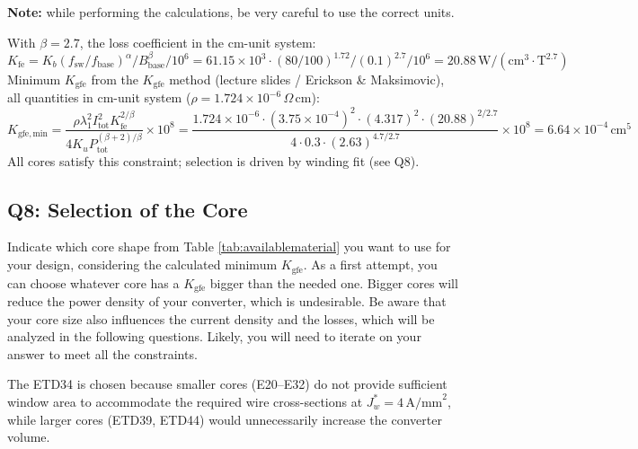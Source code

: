 \documentclass{PELsmallreport}
\begin{document}
\textbf{{Note:}} while performing the calculations, be very careful to use the correct units. \\ 

\begin{framed}
With $\beta=2.7$, the loss coefficient in the cm-unit system:
\begin{equation}
    K_\mathrm{fe} = K_b(f_\mathrm{sw}/f_\mathrm{base})^\alpha/B_\mathrm{base}^\beta/10^6
    = 61.15\!\times\!10^3\cdot(80/100)^{1.72}/(0.1)^{2.7}/10^6 = 20.88\,\mathrm{W/(cm^3\cdot T^{2.7})}
\end{equation}
Minimum $K_\mathrm{gfe}$ from the $K_\mathrm{gfe}$ method (lecture slides / Erickson \& Maksimovic),
all quantities in cm-unit system ($\rho=1.724\!\times\!10^{-6}\,\Omega\,\mathrm{cm}$):
\begin{equation}
    K_\mathrm{gfe,min} = \frac{\rho\lambda_1^2 I_\mathrm{tot}^2 K_\mathrm{fe}^{2/\beta}}{4K_u P_\mathrm{tot}^{(\beta+2)/\beta}}\times10^8
    = \frac{1.724\!\times\!10^{-6}\cdot(3.75\!\times\!10^{-4})^2\cdot(4.317)^2\cdot(20.88)^{2/2.7}}{4\cdot0.3\cdot(2.63)^{4.7/2.7}}\times10^8 = 6.64\!\times\!10^{-4}\,\mathrm{cm}^5
\end{equation}
All cores satisfy this constraint; selection is driven by winding fit (see Q8).
\end{framed}

 \hfill{}

\subsection{Q8: Selection of the Core} 
Indicate which core shape from Table \ref{tab:availablematerial} you want to use for your design, considering the calculated minimum $K_\mathrm{gfe}$. 
As a first attempt, you can choose whatever core has a $K_\mathrm{gfe}$ bigger than the needed one.
Bigger cores will reduce the power density of your converter, which is undesirable.  
Be aware that your core size also influences the current density and the losses, which will be analyzed in the following questions. 
Likely, you will need to iterate on your answer to meet all the constraints. 
\\

  \hfill{}

\noindent The ETD34 is chosen because smaller cores (E20--E32) do not provide sufficient window area to accommodate the required wire cross-sections at $J_w^* = 4\,\mathrm{A/mm}^2$, while larger cores (ETD39, ETD44) would unnecessarily increase the converter volume.
\end{document}
